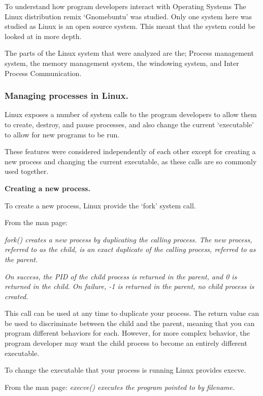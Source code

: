 \documentclass[a4paper]{report}
\begin{document}
To understand how program developers interact with Operating Systems The Linux distribution remix `Gnomebuntu' was studied. Only one system here was studied as Linux is an open source system. This meant that the system could be looked at in more depth.

The parts of the Linux system that were analyzed are the; Process management system, the memory management system, the windowing system, and Inter Process Communication.

\subsubsection*{Managing processes in Linux.}

Linux exposes a number of system calls to the program developers to allow them to create, destroy, and pause processes, and also change the current `executable' to allow for new programs to be run.

These features were considered independently of each other except for creating a new process and changing the current executable, as these calls are so commonly used together. 


\textbf{Creating a new process.}

To create a new process, Linux provide the `fork' system call. 

From the man page: 

\textit {fork() creates a new process by duplicating the calling process.  The new process, referred to as the child, is an exact duplicate  of  the calling  process, referred to as the parent.} 

\textit {On  success,  the PID of the child process is returned in the parent, and 0 is returned in the child.  On failure, -1 is  returned  in  the parent, no child process is created.} \cite{manFork}

This call can be used at any time to duplicate your process. The return value can be used to discriminate between the child and the parent, meaning that you can program different behaviors for each. However, for more complex behavior, the program developer may want the child process to become an entirely different executable.

To change the executable that your process is running Linux provides execve.

From the man page:
\textit {execve()  executes the program pointed to by filename.}
\end{document}
